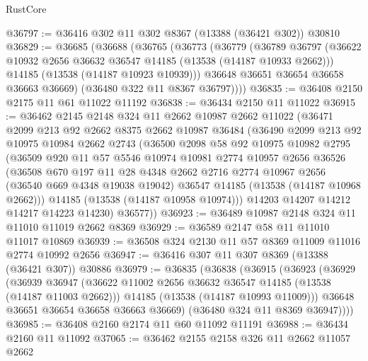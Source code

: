\begin{lexlean}{RustCore}
\begin{coremodule}
@36797 := @36416 @302 @11 @302 @8367 (@13388 (@36421 @302)) @30810
@36829 := @36685
    (@36688
      (@36765
        (@36773
          (@36779
            (@36789
              @36797
              (@36622 @10932 @2656 @36632 @36547 @14185 (@13538 (@14187 @10933 @2662)))
              @14185
              (@13538 (@14187 @10923 @10939)))
            @36648
            @36651
            @36654
            @36658
            @36663
            @36669)
          (@36480 @322 @11 @8367 @36797))))
@36835 := @36408 @2150 @2175 @11 @61 @11022 @11192
@36838 := @36434 @2150 @11 @11022
@36915 := @36462
    @2145
    @2148
    @324
    @11
    @2662
    @10987
    @2662
    @11022
    (@36471
      @2099
      @213
      @92
      @2662
      @8375
      @2662
      @10987
      @36484
      (@36490
        @2099
        @213
        @92
        @10975
        @10984
        @2662
        @2743
        (@36500
          @2098
          @58
          @92
          @10975
          @10982
          @2795
          (@36509
            @920
            @11
            @57
            @5546
            @10974
            @10981
            @2774
            @10957
            @2656
            @36526
            (@36508
              @670
              @197
              @11
              @28
              @4348
              @2662
              @2716
              @2774
              @10967
              @2656
              (@36540 @669 @4348 @19038 @19042)
              @36547
              @14185
              (@13538 (@14187 @10968 @2662)))
            @14185
            (@13538 (@14187 @10958 @10974)))
          @14203
          @14207
          @14212
          @14217
          @14223
          @14230)
        @36577))
@36923 := @36489 @10987 @2148 @324 @11 @11010 @11019 @2662 @8369
@36929 := @36589 @2147 @58 @11 @11010 @11017 @10869
@36939 := @36508 @324 @2130 @11 @57 @8369 @11009 @11016 @2774 @10992 @2656
@36947 := @36416 @307 @11 @307 @8369 (@13388 (@36421 @307)) @30886
@36979 := @36835
    (@36838
      (@36915
        (@36923
          (@36929
            (@36939
              @36947
              (@36622 @11002 @2656 @36632 @36547 @14185 (@13538 (@14187 @11003 @2662)))
              @14185
              (@13538 (@14187 @10993 @11009)))
            @36648
            @36651
            @36654
            @36658
            @36663
            @36669)
          (@36480 @324 @11 @8369 @36947))))
@36985 := @36408 @2160 @2174 @11 @60 @11092 @11191
@36988 := @36434 @2160 @11 @11092
@37065 := @36462
    @2155
    @2158
    @326
    @11
    @2662
    @11057
    @2662

\end{coremodule}
\end{lexlean}
